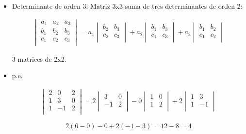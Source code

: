 \begin{itemize}
    \item Determinante de orden 3: Matriz 3x3 suma de tres determinantes de orden 2:
        \begin{center}
            \begin{align*}
                \begin{vmatrix}
                    a_{1} & a_{2} & a_{3} \\ 
                    b_{1} & b_{2} & b_{3} \\ 
                    c_{1} & c_{2} & c_{3} \\ 
                \end{vmatrix}
                = a_{1}\begin{vmatrix}
                    b_{2} & b_{3} \\ 
                    c_{2} & c_{3} \\ 
                \end{vmatrix} + a_{2}
                \begin{vmatrix}
                    b_1 &  b_3 \\ 
                    c_1 & c_3 \\  
                \end{vmatrix} + a_3 \begin{vmatrix}
                    b_1 & b_2 \\ 
                    c_1 & c_2 \\ 
                \end{vmatrix}
            \end{align*}
        \end{center}
        3 matrices de 2x2.
    
    \item p.e. \begin{center}
        \begin{align*}
            \begin{vmatrix}
                2&0&2\\ 
                1&3&0\\
                1&-1&2\\
            \end{vmatrix} = 2 \begin{vmatrix}
                3 & 0 \\ 
                -1 & 2 \\ 
            \end{vmatrix} - 0 \begin{vmatrix}
                1 & 0 \\ 
                1 & 2 \\ 
            \end{vmatrix} + 2 \begin{vmatrix}
                1 & 3 \\ 
                1 & -1 \\ 
            \end{vmatrix}
        \end{align*}
    \end{center}
    \[
      2(6-0)-0 + 2(-1-3) = 12 - 8 = 4 
    \]


\end{itemize}

